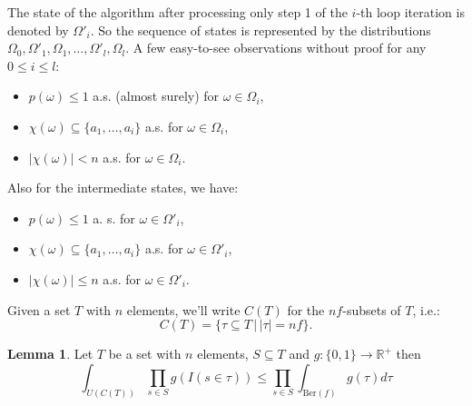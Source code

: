 \documentclass{article}
\theoremstyle{definition}
\newtheorem{lemma}{Lemma}
\begin{document}
The state of the algorithm after processing only step 1 of the $i$-th loop iteration is denoted by $\Omega'_i$.
So the sequence of states is represented by the distributions $\Omega_0, \Omega'_1, \Omega_1, \ldots, \Omega'_l, \Omega_l$.
A few easy-to-see observations without proof for any $0 \leq i \leq l$:
\begin{itemize}
\item $p(\omega) \leq 1$ a.s. (almost surely) for $\omega \in \Omega_i$,
\item $\chi(\omega) \subseteq \{a_1,\ldots,a_i\}$ a.s. for $\omega \in \Omega_i$,
\item $|\chi(\omega)| < n$ a.s. for $\omega \in \Omega_i$.
\end{itemize}
Also for the intermediate states, we have:
\begin{itemize}
\item $p(\omega) \leq 1$ a. s. for $\omega \in \Omega'_i$,
\item $\chi(\omega) \subseteq \{a_1,\ldots,a_i\}$ a.s. for $\omega \in \Omega'_i$,
\item $|\chi(\omega)| \leq n$ a.s. for $\omega \in \Omega'_i$.
\end{itemize}
Given a set $T$ with $n$ elements, we'll write $C(T)$ for the $nf$-subsets of $T$, i.e.:
\[
  C(T) = \{ \tau \subseteq T \, | \, |\tau| = nf \} \textrm{.}
\]
\begin{lemma}\label{le:samp_prod}
Let $T$ be a set with $n$ elements, $S \subseteq T$ and $g: \{0,1\} \rightarrow \mathbb R^+$ then
\[
  \int_{U(C(T))} \prod_{s \in S} g(I(s \in \tau)) \leq \prod_{s \in S} \int_{\mathrm{Ber}(f)} g(\tau) d \tau
\]
\end{lemma}
\end{document}
